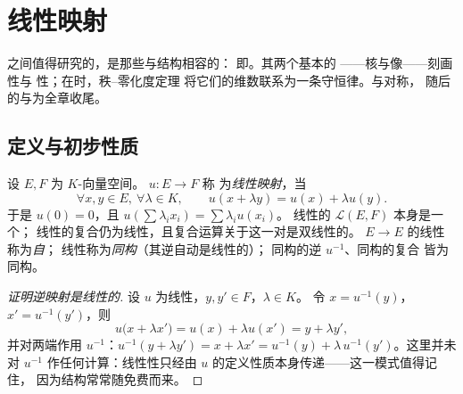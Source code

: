 \chapter{线性映射}\label{ch:b1:linmaps}

之间值得研究的，是那些与结构相容的：
即\emph{}。其两个基本的
——核与像——刻画性与
性；在时，秩--零化度定理
将它们的维数联系为一条守恒律。与对称，
随后的与为全章收尾。

\section{定义与初步性质}

\begin{definition}\label{def:b1:linmaps:def}
设 $E, F$ 为 $K$-向量空间。 $u \colon E \to F$ 称
为\emph{线性映射}，当
\[
\forall x, y \in E,\ \forall \lambda \in K, \qquad
u(x + \lambda y) = u(x) + \lambda u(y).
\]
于是 $u(0) = 0$，且 $u(\sum \lambda_i x_i) = \sum \lambda_i u(x_i)$。
线性的 $\mathcal{L}(E, F)$ 本身是一个；
线性的复合仍为线性，且复合运算关于这一对是双线性的。
$E \to E$ 的线性称为\emph{自}；
线性称为\emph{同构}（其逆自动是线性的）；
同构的逆 $u^{-1}$、同构的复合
皆为同构。
\end{definition}

\begin{proof}[证明逆映射是线性的]
设 $u$ 为线性，$y, y' \in F$，$\lambda \in K$。
令 $x = u^{-1}(y)$，$x' = u^{-1}(y')$，则
\[
u\bigl(x + \lambda x'\bigr) = u(x) + \lambda u(x')
= y + \lambda y' ,
\]
并对两端作用 $u^{-1}$：$u^{-1}(y + \lambda y') = x
+ \lambda x' = u^{-1}(y) + \lambda\,u^{-1}(y')$。这里并未对
$u^{-1}$ 作任何计算：线性性只经由
$u$ 的定义性质本身传递——这一模式值得记住，
因为结构常常随免费而来。
\end{proof}

